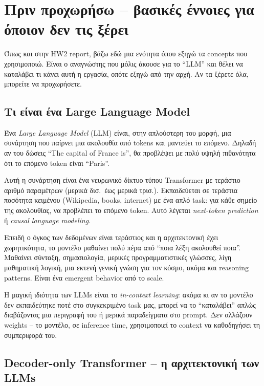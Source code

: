 \documentclass[12pt]{fphw}
\begin{document}
\section{Πριν προχωρήσω -- βασικές έννοιες για όποιον δεν τις ξέρει}

Όπως και στην HW2 report, βάζω εδώ μια ενότητα όπου εξηγώ τα concepts που χρησιμοποιώ. Είναι ο αναγνώστης που μόλις άκουσε για το ``LLM'' και θέλει να καταλάβει τι κάνει αυτή η εργασία, οπότε εξηγώ από την αρχή. Αν τα ξέρετε όλα, μπορείτε να προχωρήσετε.

\subsection{Τι είναι ένα Large Language Model}

Ένα \emph{Large Language Model} (LLM) είναι, στην απλούστερη του μορφή, μια συνάρτηση που παίρνει μια ακολουθία από tokens και μαντεύει το επόμενο. Δηλαδή αν του δώσεις ``The capital of France is'', θα προβλέψει με πολύ υψηλή πιθανότητα ότι το επόμενο token είναι ``Paris''.

Αυτή η συνάρτηση είναι ένα νευρωνικό δίκτυο τύπου Transformer \cite{vaswani2017attention} με τεράστιο αριθμό παραμέτρων (μερικά δισ.\ έως μερικά τρισ.). Εκπαιδεύεται σε τεράστια ποσότητα κειμένου (Wikipedia, books, internet) με ένα απλό task: για κάθε σημείο της ακολουθίας, να προβλέπει το επόμενο token. Αυτό λέγεται \emph{next-token prediction} ή \emph{causal language modeling}.

Επειδή ο όγκος των δεδομένων είναι τεράστιος και η αρχιτεκτονική έχει χωρητικότητα, το μοντέλο μαθαίνει πολύ πέρα από ``ποια λέξη ακολουθεί ποια''. Μαθαίνει σύνταξη, σημασιολογία, μερικές προγραμματιστικές γλώσσες, λίγη μαθηματική λογική, μια εκτενή γενική γνώση για τον κόσμο, ακόμα και reasoning patterns. Είναι ένα emergent behavior από το scale.

Η μαγική ιδιότητα των LLMs είναι το \emph{in-context learning}: ακόμα κι αν το μοντέλο δεν εκπαιδεύτηκε ποτέ στο συγκεκριμένο task μας, μπορεί να το ``καταλάβει'' απλώς διαβάζοντας μια περιγραφή του ή μερικά παραδείγματα στο prompt. Δεν αλλάζουν weights -- το μοντέλο, σε inference time, χρησιμοποιεί το context να καθοδηγήσει τη συμπεριφορά του.

\subsection{Decoder-only Transformer -- η αρχιτεκτονική των LLMs}
\end{document}
